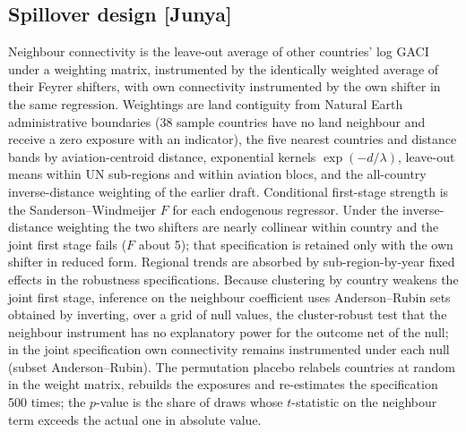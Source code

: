 \documentclass[12pt]{extarticle}
\begin{document}
\subsection*{Spillover design [Junya]}
Neighbour connectivity is the leave-out average of other countries' log
GACI under a weighting matrix, instrumented by the identically weighted
average of their Feyrer shifters, with own connectivity instrumented by the
own shifter in the same regression. Weightings are land contiguity from
Natural Earth administrative boundaries (38 sample countries have no land
neighbour and receive a zero exposure with an indicator), the five nearest
countries and distance bands by aviation-centroid distance, exponential
kernels $\exp(-d/\lambda)$, leave-out means within UN sub-regions and
within aviation blocs, and the all-country inverse-distance weighting of
the earlier draft. Conditional first-stage strength is the
Sanderson--Windmeijer $F$ for each endogenous regressor. Under the
inverse-distance weighting the two shifters are nearly collinear within
country and the joint first stage fails ($F$ about 5); that specification
is retained only with the own shifter in reduced form. Regional trends are
absorbed by sub-region-by-year fixed effects in the robustness
specifications. Because clustering by country weakens the joint first
stage, inference on the neighbour coefficient uses Anderson--Rubin sets
obtained by inverting, over a grid of null values, the cluster-robust test
that the neighbour instrument has no explanatory power for the outcome net
of the null; in the joint specification own connectivity remains
instrumented under each null (subset Anderson--Rubin). The permutation placebo relabels countries at random in
the weight matrix, rebuilds the exposures and re-estimates the
specification 500 times; the $p$-value is the share of draws whose
$t$-statistic on the neighbour term exceeds the actual one in absolute
value.
\end{document}
